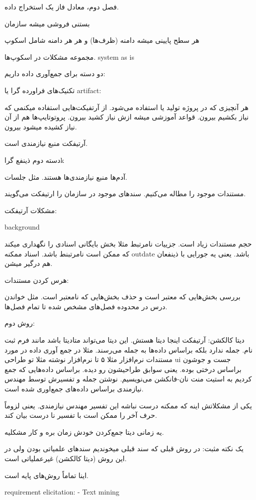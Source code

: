 فصل دوم، معادل فاز یک استخراج داده.

بستنی فروشی میشه سازمان

هر سطح پایینی میشه دامنه (ظرف‌ها)
و هر هر دامنه شامل اسکوپ

مجموعه مشکلات در اسکوپ‌ها. system as is

دو دسته برای جمع‌آوری داده داریم:

تکنیک‌های فراورده گرا یا artifact:

هر آنچیزی که در پروژه تولید یا استفاده می‌شود. از آرتفیکت‌هایی استفاده میکنمی که
نیاز بکشیم بیرون. قواعد آموزشی میشه ازش نیاز کشید بیرون. پروتوتایپ‌ها هم از آن
نیاز کشیده میشود بیرون.

آرتیفکت منبع نیازمندی است.


دسته دوم ذینفع گراk

آدم‌ها منبع نیازمندی‌ها هستند. مثل جلسات.

مستندات موجود را مطاله می‌کنیم. سند‌های موجود در سازمان را ارتیفکت می‌گویند.

مشکلات آرتیفکت:

background

حجم مستندات زیاد است.
جزيیات نامرتبط مثلا بخش بایگانی اسنادی را نگهداری میکند که ممکن است نامرتبنط
باشد.
اسناد ممکنه outdate باشد. یعنی یه جورایی با ذینفعان هم درگیر میشن.

هرس کردن مستندات:

بررسی بخش‌هایی که معتبر است و حذف بخش‌هایی که نامعتبر است. مثل خواندن درس در
محدوده فصل‌های مشخص شده تا تمام فصل‌ها.

روش دوم:

دیتا کالکشن: آرتیفکت اینجا دیتا هستش. این دیتا می‌تواند متادیتا باشد مانند فرم
ثبت نام. جمله ندارد بلکه براساس داده‌ها به جمله می‌رسند. مثلا در جمع آوری داده
در مورد مستندات نرم‌افزار مثلا ۵ تا نرم‌افزار نوشته مثلا تو طراحی ui جست و جوشون
براساس درختی بوده. یعنی سوابق طراحیشون رو دیده. براساس داده‌هایی که جمع کردیم به
استیت منت نان-فانکشن می‌نویسیم. نوشتن جمله و تفسیرش توسط مهندس نیازمندی براساس
داده‌های جمع‌اوری شده است.

یکی از مشکلاتش اینه که ممکنه درست نباشه این تفسیر مهندس نیازمندی. یعنی لزوماً
حرف آخر را ممکن است با تفسیر نا درست بیان کند.

یه زمانی دیتا جمع‌کردن خودش زمان بره و کار مشکلیه. 

یک نکته مثبت: 
در روش قبلی که سند قبلی میخوندیم سند‌های علمیاتی بودن ولی در این روش (دیتا
کالکشن) غیرعملیاتی است.

اینا تماماً روش‌‌های پایه است. 

requirement elicitation:
- Text mining

